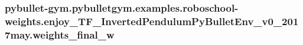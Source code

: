 \subsubsection[{\texorpdfstring{weights\+\_\+final\+\_\+w}{weights_final_w}}]{\setlength{\rightskip}{0pt plus 5cm}pybullet-\/gym.\+pybulletgym.\+examples.\+roboschool-\/weights.\+enjoy\+\_\+\+T\+F\+\_\+\+Inverted\+Pendulum\+Py\+Bullet\+Env\+\_\+v0\+\_\+2017may.\+weights\+\_\+final\+\_\+w}\hypertarget{namespacepybullet-gym_1_1pybulletgym_1_1examples_1_1roboschool-weights_1_1enjoy___t_f___inverted9d6b81a55deda3e52174841fe13ce955_a6d5eb2cc0324e47372e27449808dfc43}{}\label{namespacepybullet-gym_1_1pybulletgym_1_1examples_1_1roboschool-weights_1_1enjoy___t_f___inverted9d6b81a55deda3e52174841fe13ce955_a6d5eb2cc0324e47372e27449808dfc43}
